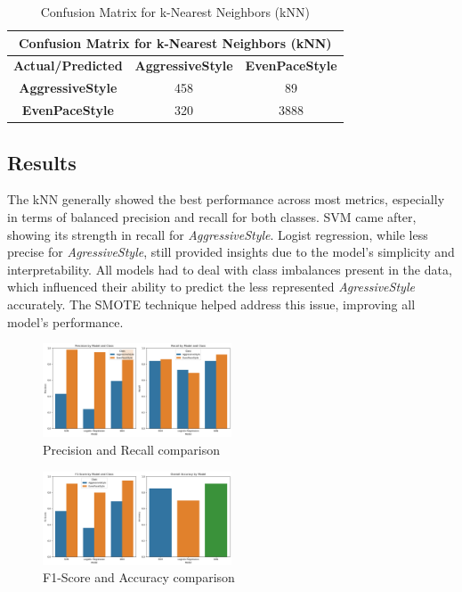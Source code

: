 \documentclass[10pt,journal,compsoc]{IEEEtran}
\begin{document}
\begin{table}[h]
    \centering
    \begin{tabular}{|c|c|c|}
    \hline
    \multicolumn{3}{|c|}{\textbf{Confusion Matrix for k-Nearest Neighbors (kNN)}} \\
    \hline
    \textbf{Actual/Predicted} & \textbf{AggressiveStyle} & \textbf{EvenPaceStyle} \\ \hline
    \textbf{AggressiveStyle} & 458 & 89 \\ \hline
    \textbf{EvenPaceStyle} & 320 & 3888 \\ \hline
    \end{tabular}
    \caption{Confusion Matrix for k-Nearest Neighbors (kNN)}
    \label{table:knn_confusion_matrix}
\end{table}

\subsection{Results}
The kNN generally showed the best performance across most metrics, especially in terms of balanced precision and recall for both classes. SVM came after, 
showing its strength in recall for \textit{AggressiveStyle}. Logist regression, while less precise for \textit{AgressiveStyle}, still provided insights due 
to the model's simplicity and interpretability. All models had to deal with class imbalances present in the data, which influenced their ability to predict the less represented 
\textit{AgressiveStyle} accurately. The SMOTE technique helped address this issue, improving all model's performance. 

\begin{figure}[h]
    \centering
    \includegraphics[width=0.5\textwidth]{images/comparison1.png}
    \caption{Precision and Recall comparison}
    \label{fig:enter-label}
\end{figure}

\begin{figure}[h]
    \centering
    \includegraphics[width=0.5\textwidth]{images/comparison2.png}
    \caption{F1-Score and Accuracy comparison}
    \label{fig:enter-label}
\end{figure}
\end{document}
